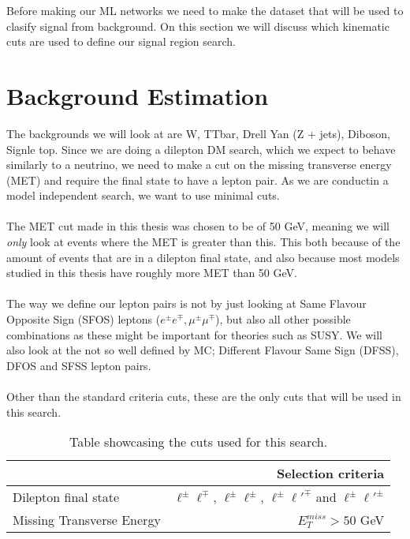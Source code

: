 \documentclass[14pt, a4paper]{book}
\begin{document}
Before making our ML networks we need to make the dataset that will be used to clasify signal from background. On this section we will discuss which kinematic cuts are used to define our signal region search. 




\section{Background Estimation}
The backgrounds we will look at are W, TTbar, Drell Yan (Z + jets), Diboson, Signle top. Since we are doing a dilepton DM search, which we expect to behave similarly to a neutrino, 
we need to make a cut on the missing transverse energy (MET) and require the final state to have a lepton pair. As we are conductin a model independent search, we want to use minimal cuts.\\
\\The MET cut made in this thesis was chosen to be of 50 GeV, meaning we will \textit{only} look at events where the MET is greater than this. 
This both because of the amount of events that are in a dilepton final state, and also because most models studied in this thesis have roughly more MET than 50 GeV.\\
\\The way we define our lepton pairs is not by just looking at Same Flavour Opposite Sign (SFOS) leptons ($e^\pm e^\mp, \mu^\pm\mu^\mp$), but also all other possible combinations as these might be important for theories such as SUSY.
We will also look at the not so well defined by MC; Different Flavour Same Sign (DFSS), DFOS and SFSS lepton pairs. \\
\\Other than the standard criteria cuts, these are the only cuts that will be used in this search.
\begin{table}[!h]
    \centering
    \begin{tabular}{l|r}\midrule\midrule
                                                                                & Selection criteria        \\\midrule
        Dilepton final state                                                    & $\ell^\pm \ell^\mp$, $\ell^\pm \ell^\pm$, $\ell^\pm \ell'^\mp$ and $\ell^\pm \ell'^\pm$    \\
        Missing Transverse Energy                                               & $E_T^{miss} > 50$ GeV     \\\midrule\midrule
    \end{tabular}
    \caption[Cuts for model-indepentent search]{Table showcasing the cuts used for this search.}
    \label{tab:MI_Cuts}
\end{table}
\end{document}
